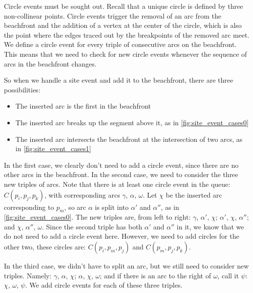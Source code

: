\documentclass[12pt,twoside]{reedthesis}
\begin{document}
      Circle events must be sought out. Recall that a unique circle is defined by three non-collinear points. Circle events trigger the removal of an arc from the beachfront and the addition of a vertex at the center of the circle, which is also the point where the edges traced out by the breakpoints of the removed arc meet. We define a circle event for every triple of consecutive arcs on the beachfront. This means that we need to check for new circle events whenever the sequence of arcs in the beachfront changes.\par

      So when we handle a site event and add it to the beachfront, there are three possibilities:
      \begin{itemize}
      \setlength\itemsep{.5em}
      \item The inserted arc is the first in the beachfront
      \item The inserted arc breaks up the segment above it, as in \cref{fig:site_event_cases0}
      \item The inserted arc intersects the beachfront at the intersection of two arcs, as in \cref{fig:site_event_cases1}
      \end{itemize}
      In the first case, we clearly don't need to add a circle event, since there are no other arcs in the beachfront. In the second case, we need to consider the three new triples of arcs. Note that there is at least one circle event in the queue: $C(p_{i}, p_{j}, p_{k})$, with corresponding arcs $\gamma$, $\alpha$, $\omega$. Let $\chi$ be the inserted arc corresponding to $p_{m}$, so arc $\alpha$ is split into $\alpha'$ and $\alpha''$, as in \cref{fig:site_event_cases0}. The new triples are, from left to right: $\gamma$, $\alpha'$, $\chi$; $\alpha'$, $\chi$, $\alpha''$; and $\chi$, $\alpha''$, $\omega$. Since the second triple has both $\alpha'$ and $\alpha''$ in it, we know that we do not need to add a circle event here. However, we need to add circles for the other two, these circles are: $C(p_{i}, p_{m}, p_{j})$ and $C(p_{m}, p_{j}, p_{k})$. \par

      In the third case, we didn't have to split an arc, but we still need to consider new triples. Namely: $\gamma$, $\alpha$, $\chi$; $\alpha$, $\chi$, $\omega$; and if there is an arc to the right of $\omega$, call it $\psi$:  $\chi$, $\omega$, $\psi$. We add circle events for each of these three triples.\par
\end{document}
